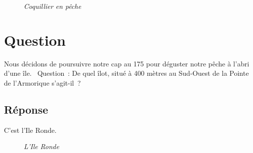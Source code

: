 \documentclass[12pt, report]{article}
\begin{document}
\begin{center}
\begin{figure}[ht]
\caption{\textit{Coquillier en pêche}}
\end{figure}
\end{center}

\section{Question}
Nous décidons de poursuivre notre cap au 175 pour déguster notre pêche à l’abri d’une île.  Question : De quel îlot, situé à 400 mètres au Sud-Ouest de la Pointe de l'Armorique s’agit-il ?
\subsection*{Réponse}
C'est l'Ile Ronde.
\begin{center}
\begin{figure}[ht]
\caption{\textit{L'Ile Ronde}}
\end{figure}
\end{center}
\end{document}
